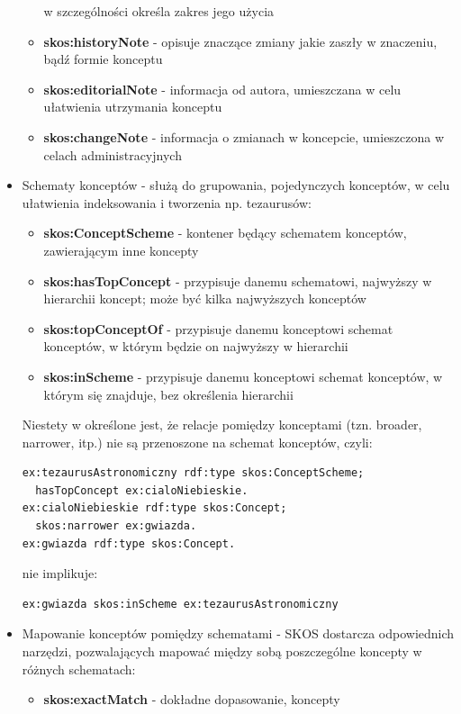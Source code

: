 \begin{itemize}
\begin{itemize}
        w szczególności określa zakres jego użycia
      \item \textbf{skos:historyNote} - opisuje znaczące zmiany jakie zaszły w 
        znaczeniu, bądź formie konceptu
      \item \textbf{skos:editorialNote} - informacja od autora, umieszczana 
        w celu ułatwienia utrzymania konceptu
      \item \textbf{skos:changeNote} - informacja o zmianach w koncepcie,
        umieszczona w celach administracyjnych
    \end{itemize}
  \item Schematy konceptów - służą do grupowania, pojedynczych konceptów, w
    celu ułatwienia indeksowania i tworzenia np. tezaurusów:
    \begin{itemize}
      \item \textbf{skos:ConceptScheme} - kontener będący schematem konceptów,
        zawierającym inne koncepty
      \item \textbf{skos:hasTopConcept} - przypisuje danemu schematowi,
        najwyższy w hierarchii koncept; może być kilka najwyższych konceptów
      \item \textbf{skos:topConceptOf} - przypisuje danemu konceptowi
        schemat konceptów, w którym będzie on najwyższy w hierarchii
      \item \textbf{skos:inScheme} - przypisuje danemu konceptowi schemat
        konceptów, w którym się znajduje, bez określenia hierarchii
    \end{itemize}
    Niestety w \cite{SKOS-ref} określone jest, że relacje pomiędzy konceptami
    (tzn. broader, narrower, itp.) nie są przenoszone na schemat konceptów,
    czyli:
\begin{verbatim}
ex:tezaurusAstronomiczny rdf:type skos:ConceptScheme;
  hasTopConcept ex:cialoNiebieskie.
ex:cialoNiebieskie rdf:type skos:Concept;
  skos:narrower ex:gwiazda.
ex:gwiazda rdf:type skos:Concept.
\end{verbatim}
    nie implikuje:
\begin{verbatim}
ex:gwiazda skos:inScheme ex:tezaurusAstronomiczny
\end{verbatim}
    \item Mapowanie konceptów pomiędzy schematami - SKOS dostarcza odpowiednich
      narzędzi, pozwalających mapować między sobą poszczególne koncepty w 
      różnych schematach:
      \begin{itemize}
        \item \textbf{skos:exactMatch} - dokładne dopasowanie, koncepty

\end{itemize}
\end{itemize}
